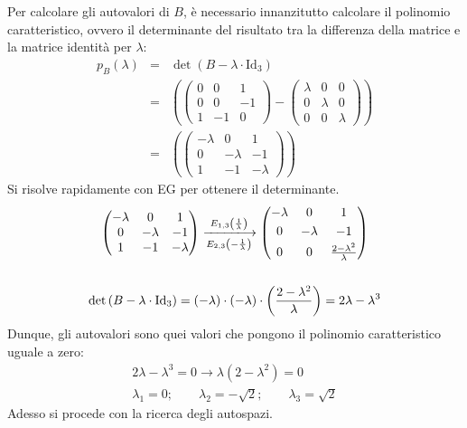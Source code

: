 \documentclass[a4paper]{article}
\makeatletter
\newenvironment{rowequmat}[1]{\left(\array{@{}#1@{}}}{\endarray\right)}
\makeatother
\begin{document}
	\noindent
	Per calcolare gli autovalori di $B$, è necessario innanzitutto calcolare il polinomio caratteristico, ovvero il determinante del risultato tra la differenza della matrice e la matrice identità per $\lambda$:
	\begin{equation*}
		\begin{array}{rcl}
			p_{B}\left(\lambda\right) &=& \det\left(B - \lambda \cdot \mathrm{Id}_{3}\right) \\ [.7em]
			&=& \left(
			\begin{pmatrix}
				0 & 0 & 1 \\
				0 & 0 & -1 \\
				1 & -1 & 0
			\end{pmatrix} -
			\begin{pmatrix}
				\lambda & 0 & 0 \\
				0 & \lambda & 0 \\
				0 & 0 & \lambda
			\end{pmatrix}
			\right) \\ [2.5em]
			&=& \left(
			\begin{pmatrix}
				-\lambda & 0 & 1 \\
				0 & -\lambda & -1 \\
				1 & -1 & -\lambda
			\end{pmatrix}
			\right)
		\end{array}
	\end{equation*}
	Si risolve rapidamente con EG per ottenere il determinante.
	\begin{gather*}
		\begin{rowequmat}{ccc}
			-\lambda & 0 & 1 \\
			0 & -\lambda & -1 \\
			1 & -1 & -\lambda
		\end{rowequmat}
		\xlongrightarrow[E_{2,3}\left(-\frac{1}{\lambda}\right)]{E_{1,3}\left(\frac{1}{\lambda}\right)}
		\begin{rowequmat}{ccc}
			-\lambda & 0 & 1 \\ [.3em]
			0 & -\lambda & -1 \\ [.3em]
			0 & 0 & \frac{2-\lambda^{2}}{\lambda}
		\end{rowequmat} \\
		\\
		\det\left(B - \lambda \cdot \mathrm{Id}_{3}\right) = \left(-\lambda\right) \cdot \left(-\lambda\right) \cdot \left(\dfrac{2-\lambda^{2}}{\lambda}\right) = 2\lambda - \lambda^{3}
	\end{gather*}
	Dunque, gli autovalori sono quei valori che pongono il polinomio caratteristico uguale a zero:
	\begin{gather*}
		2\lambda - \lambda^{3} = 0 \longrightarrow \lambda\left(2 - \lambda^{2}\right) = 0 \\
		\lambda_{1} = 0; \hspace{2em} \lambda_{2} = -\sqrt{2}; \hspace{2em} \lambda_{3} = \sqrt{2}
	\end{gather*}
	Adesso si procede con la ricerca degli autospazi.\newpage
	
\end{document}
